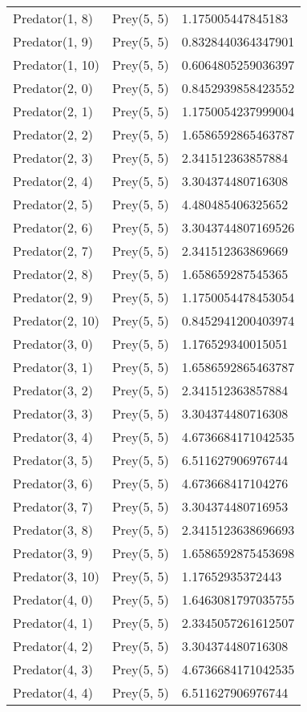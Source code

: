 \begin{longtable}{| p{} | p{} | p{} |}
Predator(1, 8) & Prey(5, 5) &1.175005447845183\\
Predator(1, 9) & Prey(5, 5) &0.8328440364347901\\
Predator(1, 10) & Prey(5, 5) &0.6064805259036397\\
Predator(2, 0) & Prey(5, 5) &0.8452939858423552\\
Predator(2, 1) & Prey(5, 5) &1.1750054237999004\\
Predator(2, 2) & Prey(5, 5) &1.6586592865463787\\
Predator(2, 3) & Prey(5, 5) &2.341512363857884\\
Predator(2, 4) & Prey(5, 5) &3.304374480716308\\
Predator(2, 5) & Prey(5, 5) &4.480485406325652\\
Predator(2, 6) & Prey(5, 5) &3.3043744807169526\\
Predator(2, 7) & Prey(5, 5) &2.341512363869669\\
Predator(2, 8) & Prey(5, 5) &1.658659287545365\\
Predator(2, 9) & Prey(5, 5) &1.1750054478453054\\
Predator(2, 10) & Prey(5, 5) &0.8452941200403974\\
Predator(3, 0) & Prey(5, 5) &1.176529340015051\\
Predator(3, 1) & Prey(5, 5) &1.6586592865463787\\
Predator(3, 2) & Prey(5, 5) &2.341512363857884\\
Predator(3, 3) & Prey(5, 5) &3.304374480716308\\
Predator(3, 4) & Prey(5, 5) &4.6736684171042535\\
Predator(3, 5) & Prey(5, 5) &6.511627906976744\\
Predator(3, 6) & Prey(5, 5) &4.673668417104276\\
Predator(3, 7) & Prey(5, 5) &3.304374480716953\\
Predator(3, 8) & Prey(5, 5) &2.3415123638696693\\
Predator(3, 9) & Prey(5, 5) &1.6586592875453698\\
Predator(3, 10) & Prey(5, 5) &1.17652935372443\\
Predator(4, 0) & Prey(5, 5) &1.6463081797035755\\
Predator(4, 1) & Prey(5, 5) &2.3345057261612507\\
Predator(4, 2) & Prey(5, 5) &3.304374480716308\\
Predator(4, 3) & Prey(5, 5) &4.6736684171042535\\
Predator(4, 4) & Prey(5, 5) &6.511627906976744\\

\end{longtable}
